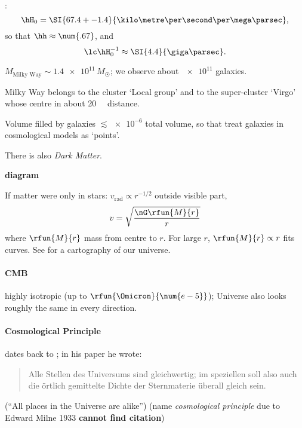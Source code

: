 \cite{Ade2014}:
\begin{equation}
\hH_0 = \SI{67.4 +- 1.4}{\kilo\metre\per\second\per\mega\parsec},
\end{equation}
so that $\hh\approx \num{.67}$, and
\begin{equation}
\lc \hH_0^{-1} \approx \SI{4.4}{\giga\parsec}.
\end{equation}

$M_\text{Milky Way} \sim \num{1.4e11}\,M_\astrosun$; we observe about 
$\num{e11}$ galaxies.

Milky Way belongs to the cluster `Local group' and to the super-cluster `Virgo' 
whose centre in about \SI{20}{\mega\parsec} distance.

Volume filled by galaxies $\lesssim \num{e-6}$ total volume, so that treat 
galaxies in cosmological models as `points'.

There is also \emph{Dark Matter}.

\textbf{diagram}
\cite{1933AcHPh...6..110Z}

If matter were only in stars: $v_\text{rad} \propto r^{-1/2}$ outside visible 
part,
\begin{equation}
v = \sqrt{\frac{\nG \rfun{M}{r}}{r}}
\end{equation}
where $\rfun{M}{r}$ mass from centre to $r$. For large $r$, $\rfun{M}{r} 
\propto r$ fits curves. See \cite{GottIII2005} for a cartography of our 
universe.

\paragraph{CMB} highly isotropic (up to $\rfun{\Omicron}{\num{e-5}}$); Universe 
also looks roughly the same in every direction.


\paragraph{Cosmological Principle} dates back to 
\cite{einstein1917kosmologische}; in his paper 
 he wrote:
\begin{quote}
Alle Stellen des Universums sind gleichwertig; im speziellen soll also auch die 
\"ortlich gemittelte Dichte der Sternmaterie \"uberall gleich sein.
\end{quote}
(``All places in the Universe are alike'') (name \emph{cosmological principle} 
due to Edward Milne 1933 \textbf{cannot find citation})


